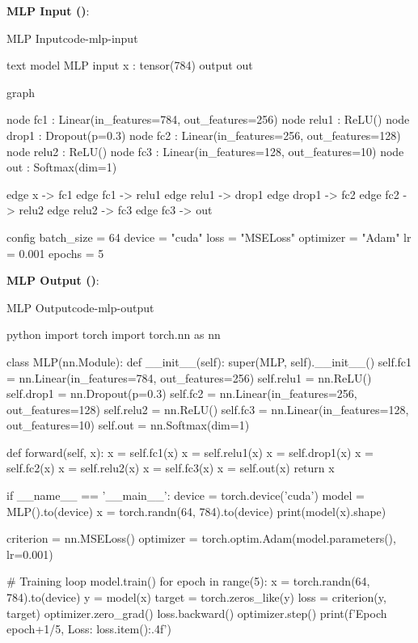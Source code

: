 \documentclass{nngraph-en}
\begin{document}
\textbf{MLP Input ()}:
\begin{codebox}{MLP Input}{code-mlp-input}
\begin{amzcode}[fontsize=\scriptsize]{text}
model MLP {
    input x : tensor(784)
    output out
}

graph {
    node fc1   : Linear(in_features=784, out_features=256)
    node relu1 : ReLU()
    node drop1 : Dropout(p=0.3)
    node fc2   : Linear(in_features=256, out_features=128)
    node relu2 : ReLU()
    node fc3   : Linear(in_features=128, out_features=10)
    node out   : Softmax(dim=1)

    edge x -> fc1
    edge fc1 -> relu1
    edge relu1 -> drop1
    edge drop1 -> fc2
    edge fc2 -> relu2
    edge relu2 -> fc3
    edge fc3 -> out
}

config {
    batch_size = 64
    device = "cuda"
    loss = "MSELoss"
    optimizer = "Adam"
    lr = 0.001
    epochs = 5
}
\end{amzcode}
\end{codebox}

\textbf{MLP Output ()}:
\begin{codebox}{MLP Output}{code-mlp-output}
\begin{amzcode}[fontsize=\scriptsize]{python}
import torch
import torch.nn as nn

class MLP(nn.Module):
    def __init__(self):
        super(MLP, self).__init__()
        self.fc1 = nn.Linear(in_features=784, out_features=256)
        self.relu1 = nn.ReLU()
        self.drop1 = nn.Dropout(p=0.3)
        self.fc2 = nn.Linear(in_features=256, out_features=128)
        self.relu2 = nn.ReLU()
        self.fc3 = nn.Linear(in_features=128, out_features=10)
        self.out = nn.Softmax(dim=1)

    def forward(self, x):
        x = self.fc1(x)
        x = self.relu1(x)
        x = self.drop1(x)
        x = self.fc2(x)
        x = self.relu2(x)
        x = self.fc3(x)
        x = self.out(x)
        return x

if __name__ == '__main__':
    device = torch.device('cuda')
    model = MLP().to(device)
    x = torch.randn(64, 784).to(device)
    print(model(x).shape)

    criterion = nn.MSELoss()
    optimizer = torch.optim.Adam(model.parameters(), lr=0.001)

    # Training loop
    model.train()
    for epoch in range(5):
        x = torch.randn(64, 784).to(device)
        y = model(x)
        target = torch.zeros_like(y)
        loss = criterion(y, target)
        optimizer.zero_grad()
        loss.backward()
        optimizer.step()
        print(f'Epoch {epoch+1}/5, Loss: {loss.item():.4f}')
\end{amzcode}
\end{codebox}
\end{document}
